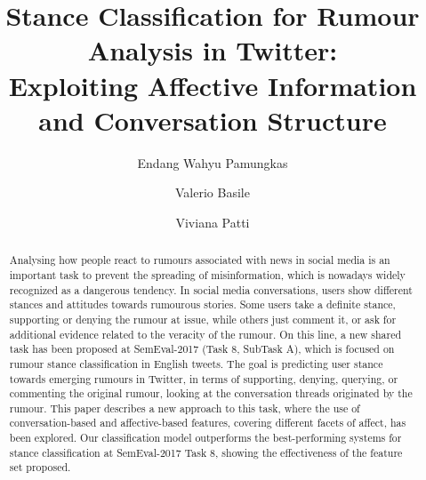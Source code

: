 \documentclass[sigconf]{acmart}
\begin{document}
\title{Stance Classification for Rumour Analysis in Twitter: \\ Exploiting Affective Information and Conversation Structure}


\author{Endang Wahyu Pamungkas}

\author{Valerio Basile}

\author{Viviana Patti}


\begin{abstract}
Analysing how people react to rumours associated with news in social media is an important task to prevent the spreading of misinformation, which is nowadays widely recognized as a dangerous tendency. 
In social media conversations, users show different stances and attitudes towards rumourous stories. Some users take a definite stance, supporting or denying the rumour at issue, while others just comment it, or ask for additional evidence related to the veracity of the rumour. On this line, a new 
shared task has been proposed at SemEval-2017 (Task 8, SubTask A), which is focused on rumour stance classification in English tweets. The goal is predicting user stance towards emerging rumours in Twitter, in terms of supporting, denying, querying, or commenting the original rumour, looking at the conversation threads originated by the rumour. This paper describes a new approach to this task, where the use of conversation-based and affective-based features, covering different facets of affect, has been explored. 
Our classification model outperforms the best-performing systems for stance classification at SemEval-2017 Task 8,
showing the effectiveness of the feature set proposed.
\end{abstract}
\end{document}
